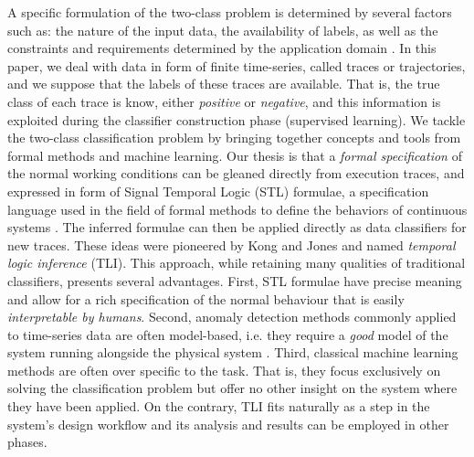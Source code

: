A specific formulation of the two-class problem is determined by several factors such as: the nature of the input data,
the availability of labels, as well as the constraints and requirements determined by the application domain \cite{chandola_anomaly_2009}.
In this paper, we deal with data in form of finite time-series, called traces or trajectories, and we suppose that the labels of these traces are available. That is, the true class of each trace is know, either \emph{positive} or \emph{negative}, and this information is exploited during the classifier construction phase (supervised learning).
We tackle the two-class classification problem by bringing together concepts and tools from formal methods and machine learning. Our thesis is that a \emph{formal specification} of the normal working conditions can be gleaned directly from execution traces, and expressed in form of Signal Temporal Logic (STL) formulae, a specification language used in the field of formal methods to define the behaviors of continuous systems \cite{maler_monitoring_2004}.
The inferred formulae can then be applied directly as data classifiers for new traces. These ideas were pioneered by Kong and Jones \cite{kong_temporal_2014, jones_anomaly_2014} and named \emph{temporal logic inference} (TLI). This approach, while retaining many qualities of traditional classifiers, presents several advantages.
First, STL formulae have precise meaning and allow for a rich specification of the normal behaviour that is easily \emph{interpretable by humans}.
Second, anomaly detection methods commonly applied to time-series data are often model-based, i.e. they require a \emph{good} model of the system running alongside the physical system \cite{isermann_faultdiagnosis_2006}.
Third, classical machine learning methods are often over specific to the task. That is, they focus exclusively on solving the classification problem but offer no other insight on the system where they have been applied. On the contrary, TLI fits naturally as a step in the system's design workflow and its analysis and results can be employed in other phases.

